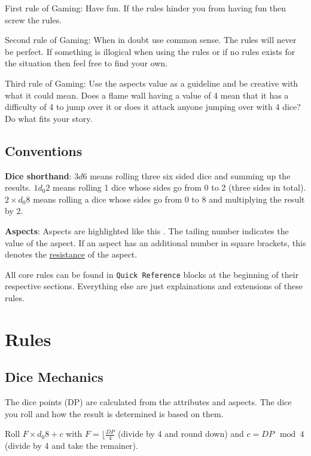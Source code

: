 \documentclass[11pt]{article}
\begin{document}
{First rule of Gaming: Have fun. If the rules hinder you from having fun then screw the rules.

Second rule of Gaming: When in doubt use common sense. The rules will never be perfect. If something is illogical when using the rules or if no rules exists for the situation then feel free to find your own. 

Third rule of Gaming: Use the aspects value as a guideline and be creative with what it could mean. Does a flame wall having a value of 4 mean that it has a difficulty of 4 to jump over it or does it attack anyone jumping over with 4 dice? Do what fits your story. 


\subsection{Conventions}
\label{sec:org63d126d}
\textbf{Dice shorthand}: \(3 d 6\) means rolling three six sided dice and summing up the results. \(1 d_0 2\) means rolling 1 dice whose sides go from 0 to 2 (three sides in total). \(2 \times d_0 8\) means rolling a dice whose sides go from 0 to 8 and multiplying the result by 2.

\textbf{Aspects}: Aspects are highlighted like this . The tailing number indicates the value of the aspect. If an aspect has an additional number in square brackets, this denotes the \hyperref[sec:org126c678]{resistance} of the aspect.

All core rules can be found in \texttt{Quick Reference} blocks at the beginning of their respective sections. Everything else are just explainations and extensions of these rules.


\section{Rules}
\label{sec:org3e680cc}

\subsection{Dice Mechanics}
\label{sec:orgfebbd11}
\begin{short}
The dice points (DP) are calculated from the attributes and aspects. The dice you roll and how the result is determined is based on them.

Roll \(F \times d_0 8 + c\) with \(F = \lfloor \frac{DP}{4}\) (divide by 4 and round down) and \(c = DP \mod{4}\) (divide by 4 and take the remainer). 
\end{short}

}
\end{document}

